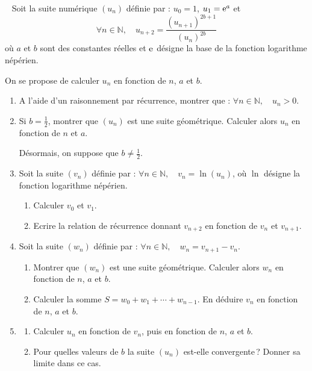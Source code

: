 %
\begin{exo}~\newline
      Soit la suite num\'erique $(u_n)$ d\'efinie par : 
      $u_0 = 1$, $u_1 = \mathrm{e}^{a}$ et $$ \forall n \in \mathbb{N}, \quad u_{n+2} = \frac{(u_{n+1})^{2b+1}}{(u_n)^{2b}} $$
      o\`u $a$ et $b$ sont des constantes r\'eelles et $\mathrm{e}^{}$ d\'esigne la base de la fonction logarithme n\'ep\'erien.
      
      On se propose de calculer $u_n$ en fonction de $n$, $a$ et $b$.
      \begin{enumerate}
            \item A l'aide d'un raisonnement par r\'ecurrence, montrer que : $\forall n \in \mathbb{N}, \quad u_n > 0$.
            \item Si $b=\frac{1}{2}$, montrer que $(u_n)$ est une suite g\'eom\'etrique.
                  Calculer alors $u_n$ en fonction de $n$ et $a$.
                  
                  D\'esormais, on suppose que $b \neq \frac{1}{2}$.
            \item Soit la suite $(v_n)$ d\'efinie par : $\forall n \in \mathbb{N}, \quad v_n = \ln (u_n)$,
                  o\`u $\ln$ d\'esigne la fonction logarithme n\'ep\'erien.
                  \begin{enumerate}
                        \item Calculer $v_0$ et $v_1$.
                        \item Ecrire la relation de r\'ecurrence donnant $v_{n+2}$ en fonction de $v_n$ et $v_{n+1}$.
                  \end{enumerate}
            \item Soit la suite $(w_n)$ d\'efinie par : $\forall n \in \mathbb{N}, \quad w_n = v_{n+1} - v_n$.
                  \begin{enumerate}
                        \item Montrer que $(w_n)$ est une suite g\'eom\'etrique.
                              Calculer alors $w_n$ en fonction de $n$, $a$ et $b$.
                        \item Calculer la somme $S = w_0 + w_1 + \cdots + w_{n-1}$.
                              En d\'eduire $v_n$ en fonction de $n$, $a$ et $b$.
                  \end{enumerate}
            \item \begin{enumerate}
                        \item Calculer $u_n$ en fonction de $v_n$, puis en fonction de $n$, $a$ et $b$.
                        \item Pour quelles valeurs de $b$ la suite $(u_n)$ est-elle convergente\,?
                              Donner sa limite dans ce cas.
                  \end{enumerate}
      \end{enumerate}
\end{exo}

